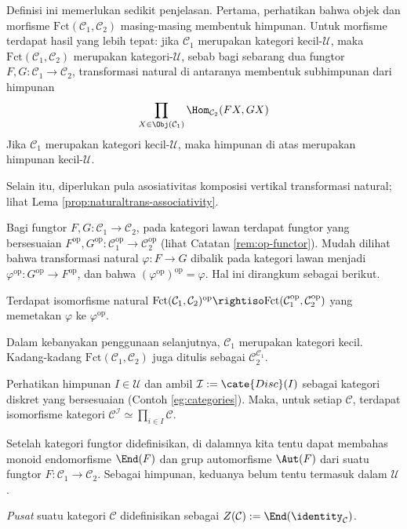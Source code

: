 \begin{remark}
	Definisi ini memerlukan sedikit penjelasan. Pertama, perhatikan bahwa objek dan morfisme $\text{Fct}(\mathcal{C}_1, \mathcal{C}_2)$ masing-masing membentuk himpunan. Untuk morfisme terdapat hasil yang lebih tepat: jika $\mathcal{C}_1$ merupakan kategori kecil-$\mathcal{U}$, maka $\text{Fct}(\mathcal{C}_1, \mathcal{C}_2)$ merupakan kategori-$\mathcal{U}$, sebab bagi sebarang dua fungtor $F, G: \mathcal{C}_1 \to \mathcal{C}_2$, transformasi natural di antaranya membentuk subhimpunan dari himpunan
	\[ \prod_{X \in \Obj(\mathcal{C}_1)} \Hom_{\mathcal{C}_2} (FX, GX) \]
	Jika $\mathcal{C}_1$ merupakan kategori kecil-$\mathcal{U}$, maka himpunan di atas merupakan himpunan kecil-$\mathcal{U}$.

	Selain itu, diperlukan pula asosiativitas komposisi vertikal transformasi natural; lihat Lema \ref{prop:naturaltrans-associativity}.
\end{remark}

Bagi fungtor $F, G : \mathcal{C}_1 \to \mathcal{C}_2$, pada kategori lawan terdapat fungtor yang bersesuaian $F^\text{op}, G^\text{op}: \mathcal{C}_1^\text{op} \to \mathcal{C}_2^\text{op}$ (lihat Catatan \ref{rem:op-functor}). Mudah dilihat bahwa transformasi natural $\varphi: F \to G$ dibalik pada kategori lawan menjadi $\varphi^\text{op}: G^\text{op} \to F^\text{op}$, dan bahwa $(\varphi^{\text{op}})^{\text{op}} = \varphi$. Hal ini dirangkum sebagai berikut.

\begin{proposition}\label{prop:op-functor-cat}
	Terdapat isomorfisme natural $\text{Fct}(\mathcal{C}_1, \mathcal{C}_2)^\text{op} \rightiso \text{Fct}(\mathcal{C}_1^{\text{op}}, \mathcal{C}_2^{\text{op}})$ yang memetakan $\varphi$ ke $\varphi^\text{op}$.
\end{proposition}

Dalam kebanyakan penggunaan selanjutnya, $\mathcal{C}_1$ merupakan kategori kecil. Kadang-kadang $\text{Fct}(\mathcal{C}_1, \mathcal{C}_2)$ juga ditulis sebagai $\mathcal{C}_2^{\mathcal{C}_1}$.
\begin{example}
	Perhatikan himpunan $I \in \mathcal{U}$ dan ambil $\mathcal{I} := \cate{Disc}(I)$ sebagai kategori diskret yang bersesuaian (Contoh \ref{eg:categories}). Maka, untuk setiap $\mathcal{C}$, terdapat isomorfisme kategori $\mathcal{C}^{\mathcal{I}} \simeq \prod_{i \in I} \mathcal{C}$.
\end{example}

Setelah kategori fungtor didefinisikan, di dalamnya kita tentu dapat membahas monoid endomorfisme $\End(F)$ dan grup automorfisme $\Aut(F)$ dari suatu fungtor $F: \mathcal{C}_1 \to \mathcal{C}_2$. Sebagai himpunan, keduanya belum tentu termasuk dalam $\mathcal{U}$.
\begin{definition}\label{def:cat-center}
	\emph{Pusat} suatu kategori $\mathcal{C}$ didefinisikan sebagai $Z(\mathcal{C}) := \End(\identity_{\mathcal{C}})$.
\end{definition}

